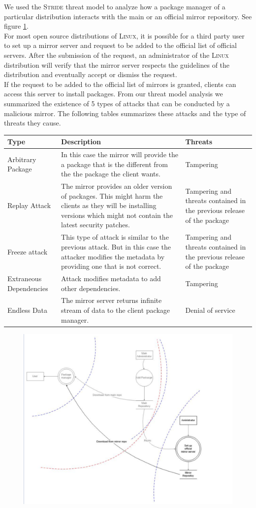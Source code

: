 \documentclass[a4paper, 11pt]{article}
\begin{document}
We used the \textsc{Stride} threat model to analyze how a package manager of a particular distribution interacts with the main or an official mirror repository. See figure \ref{fig:model}.\\
For most open source distributions of \textsc{Linux}, it is possible for a third party user to set up a mirror server and request to be added to the official list of official servers. After the submission of the request, an administrator of the \textsc{Linux} distribution will verify that the mirror server respects the guidelines of the distribution and eventually accept or dismiss the request.\\
If the request to be added to the official list of mirrors is granted, clients can access this server to install packages.
From our threat model analysis we summarized the existence of 5 types of attacks that can be conducted by a malicious mirror. The following tables summarizes these attacks and the type of threats they cause.
\linebreak
\begin{center}
\begin{tabularx}{\textwidth}{|X|X|X|}
\hline
Type & Description & Threats \\
\hline
Arbitrary Package & In this case the mirror will provide the a package that is the different from the the package the client wants.
& Tampering\\
\hline
Replay Attack & The mirror provides an older version of packages. This might harm the clients as they will be installing versions which might not contain the latest security patches. & Tampering and threats contained in the previous release of the package\\
\hline
Freeze attack & This type of attack is similar to the previous attack. But in this case the attacker modifies the metadata by providing one that is not correct. & Tampering and threats contained in the previous release of the package \\
\hline
Extraneous Dependencies & Attack modifies metadata to add other dependencies. & Tampering \\
\hline
Endless Data & The mirror server returns infinite stream of data to the client package manager. & Denial of service \\
\hline
\end{tabularx}
\end{center}

\begin{figure}
\includegraphics[scale=0.5]{model.png}
\label{fig:model}
\end{figure}
\end{document}
